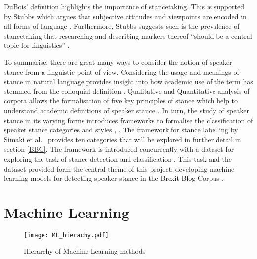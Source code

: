 \documentclass[Dissertation.tex]{subfiles}
\begin{document}
DuBois' \cite{duboisStanceTriangle2007} definition highlights the importance of stancetaking. This is supported by Stubbs  which argues that subjective attitudes and viewpoints are encoded in all forms of language \cite{stubbsMatterProlongedField1986}. Furthermore, Stubbs suggests such is the prevalence of stancetaking that researching and describing markers thereof ``should be  a  central
topic for linguistics'' \cite{stubbsMatterProlongedField1986}.

To summarise, there are great many ways to consider the notion of speaker stance from a linguistic point of view. Considering the usage and meanings of stance in natural language provides insight into how academic use of the term has stemmed from the colloquial definition \cite{barlowUsagebasedModelsLanguage2000}. Qualitative and Quantitative analysis of corpora allows the formalisation of five key principles of stance which help to understand academic definitions of speaker stance \cite{englebretsonStancetakingDiscourseSubjectivity2007}. In turn, the study of speaker stance in its varying forms introduces frameworks to formalise the classification of speaker stance categories and styles \cite{biberStylesStanceEnglish1989}, \cite{simakiAnnotatingSpeakerStance2017}. The framework for stance labelling by Simaki et al.\ \cite{simakiAnnotatingSpeakerStance2017} provides ten categories that will be explored in further detail in section \ref{BBC}. The framework is introduced concurrently with a dataset for exploring the task of stance detection and classification \cite{simakiAnnotatingSpeakerStance2017}. This task and the dataset provided form the central theme of this project: developing machine learning models for detecting speaker stance in the Brexit Blog Corpus \cite{simakiAnnotatingSpeakerStance2017}.
\section{Machine Learning}

\begin{figure}
	\centering
	\texttt{[image: ML\_hierachy.pdf]}
	\caption{Hierarchy of Machine Learning methods}
	\label{mlHierachy}
\end{figure}
\end{document}
